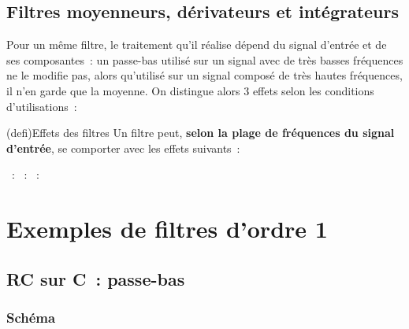 \documentclass[../../main/main.tex]{subfiles}
\begin{document}
\subsection{Filtres moyenneurs, dérivateurs et intégrateurs}
Pour un même filtre, le traitement qu'il réalise dépend du signal d'entrée et de
ses composantes~: un passe-bas utilisé sur un signal avec de très basses
fréquences ne le modifie pas, alors qu'utilisé sur un signal composé de très hautes
fréquences, il n'en garde que la moyenne. On distingue alors 3 effets selon les
conditions d'utilisations~:
\begin{tcb}(defi){Effets des filtres}
	Un filtre peut, \textbf{selon la plage de fréquences du signal d'entrée}, se
	comporter avec les effets suivants~:
	\begin{itemize}
		~:
		~:
		~:
	\end{itemize}
\end{tcb}

\section{Exemples de filtres d'ordre 1}
\subsection{RC sur C~: passe-bas}
\subsubsection{Schéma}
\smallbreak
\noindent
\begin{minipage}{\linewidth}
	\begin{center}
		\vspace{-15pt}
	\end{center}
\end{minipage}
\end{document}
